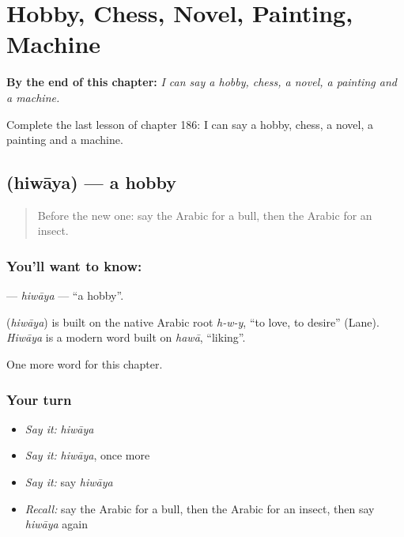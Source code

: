 
\chapter{Hobby, Chess, Novel, Painting, Machine}
\label{ch:ar-hobby-chess-novel-painting-machine}

\begin{chapteropening}
\textbf{By the end of this chapter:} \emph{I can say a hobby, chess, a novel, a painting and a machine.}

Complete the last lesson of chapter 186: I can say a hobby, chess, a novel, a painting and a machine.
\end{chapteropening}

\section[\texorpdfstring{\ar{هواية} (hiwāya)}{هواية (hiwāya)}]{ (hiwāya) — a hobby}

\label{lesson:AR-C186-hiwaya}



\begin{quote}
Before the new one: say the Arabic for a bull, then the Arabic for an insect.
\end{quote}

\subsection*{You'll want to know: }
\textbf{} — \emph{hiwāya} — \textquotedblleft{}a hobby\textquotedblright{}.

\begin{cousinweb}
\textbf{} (\emph{hiwāya}) is built on the native Arabic root \emph{h-w-y}, \textquotedblleft{}to love, to desire\textquotedblright{} (Lane). \emph{Hiwāya} is a modern word built on \emph{hawā}, \textquotedblleft{}liking\textquotedblright{}.
\end{cousinweb}

\begin{grammarlens}[title={What you've built}]
One more word for this chapter.
\end{grammarlens}

\subsection*{Your turn}
\begin{itemize}
\raggedright
  \item \emph{Say it:} \emph{hiwāya}
  \item \emph{Say it:} \emph{hiwāya}, once more
  \item \emph{Say it:} say \emph{hiwāya}
  \item \emph{Recall:} say the Arabic for a bull, then the Arabic for an insect, then say \emph{hiwāya} again
\end{itemize}


